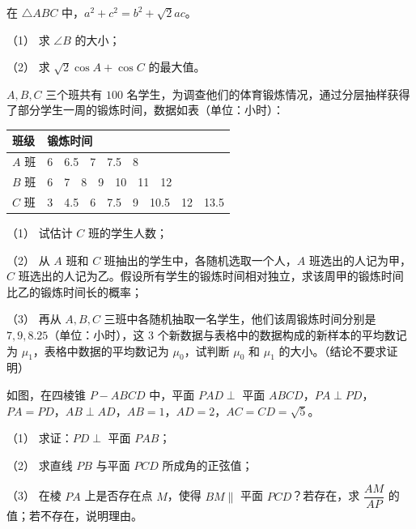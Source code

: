 \begin{question}
在 \(\triangle ABC\) 中，\(a^{2}+c^{2}=b^{2}+\sqrt{2}ac\)。

（1） 求 \(\angle B\) 的大小；

（2） 求 \(\sqrt{2}\cos A+\cos C\) 的最大值。

\end{question}
\begin{question}
\(A,B,C\) 三个班共有 \(100\) 名学生，为调查他们的体育锻炼情况，通过分层抽样获得了部分学生一周的锻炼时间，数据如表（单位：小时）：

\begin{center}
\begin{tabular}{ll}
\toprule
班级 & 锻炼时间 \\
\midrule
\(A\) 班 & 6　6.5　7　7.5　8 \\
\(B\) 班 & 6　7　8　9　10　11　12 \\
\(C\) 班 & 3　4.5　6　7.5　9　10.5　12　13.5 \\
\bottomrule
\end{tabular}
\end{center}

（1） 试估计 \(C\) 班的学生人数；

（2） 从 \(A\) 班和 \(C\) 班抽出的学生中，各随机选取一个人，\(A\) 班选出的人记为甲，\(C\) 班选出的人记为乙。假设所有学生的锻炼时间相对独立，求该周甲的锻炼时间比乙的锻炼时间长的概率；

（3） 再从 \(A,B,C\) 三班中各随机抽取一名学生，他们该周锻炼时间分别是 \(7,9,8.25\)（单位：小时），这 \(3\) 个新数据与表格中的数据构成的新样本的平均数记为 \(\mu_{1}\)，表格中数据的平均数记为 \(\mu_{0}\)，试判断 \(\mu_{0}\) 和 \(\mu_{1}\) 的大小。（结论不要求证明）

\Needspace{0.4\textheight}
\end{question}
\begin{question}
如图，在四棱锥 \(P-ABCD\) 中，平面 \(PAD\perp\) 平面 \(ABCD\)，\(PA\perp PD\)，\(PA=PD\)，\(AB\perp AD\)，\(AB=1\)，\(AD=2\)，\(AC=CD=\sqrt{5}\)。
\nopagebreak[4]
\begin{center}\end{center}
\nopagebreak[4]
（1） 求证：\(PD\perp\) 平面 \(PAB\)；

（2） 求直线 \(PB\) 与平面 \(PCD\) 所成角的正弦值；

（3） 在棱 \(PA\) 上是否存在点 \(M\)，使得 \(BM\parallel\) 平面 \(PCD\)？若存在，求 \(\dfrac{AM}{AP}\) 的值；若不存在，说明理由。

\end{question}

